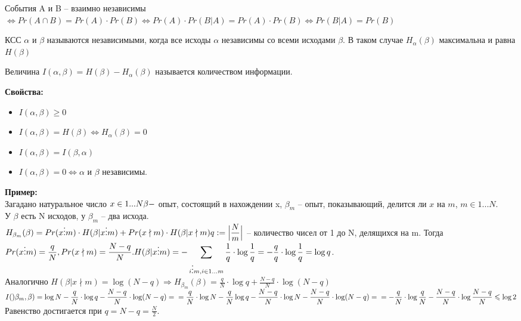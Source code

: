 	\begin{Def} 
		События A и B -- взаимно независимы $\Leftrightarrow Pr(A \cap B) = Pr(A) \cdot Pr(B) \Leftrightarrow Pr(A) \cdot Pr(B|A) = Pr(A) \cdot Pr(B) \Leftrightarrow Pr(B|A) = Pr(B)$
	\end{Def} 

	\begin{Def} 
	КСС $\alpha$ и $\beta$ называются независимыми, когда все исходы $\alpha$ независимы со всеми исходами $\beta$. В таком случае $H_{\alpha} (\beta)$ максимальна и равна $H(\beta)$
	\end{Def} 
	

	\begin{Def} 
		Величина $I(\alpha, \beta) = H(\beta) - H_{\alpha} (\beta)$ называется количеством информации.
	\end{Def} 

	\textbf{Свойства:}
	\begin{itemize}
		\item $I(\alpha, \beta) \geqslant 0$
		\item $I(\alpha, \beta) = H(\beta) \Leftrightarrow H_{\alpha} (\beta) = 0$
		\item $I(\alpha, \beta) = I(\beta, \alpha)$
		\item $I(\alpha, \beta) = 0 \Leftrightarrow \alpha \text{ и } \beta$ независимы.
	\end{itemize}
	
	\textbf{Пример:}\\
	Загадано натуральное число $x \in 1...N\\
	\beta -$ опыт, состоящий в нахождении x, $\beta_m$ -- опыт, показывающий, делится ли $x$ на $m$, $m \in 1...N$.\\ У $\beta$ есть N исходов, у $\beta_m$ -- два исхода.\\
	$\displaystyle H_{\beta_m}(\beta) = Pr (x \vdots m) \cdot H(\beta | x \vdots m) + Pr (x \nmid m) \cdot H (\beta | x \nmid m)\\
	q := \Big| \frac{N}{m} \Big|$ -- количество чисел от 1 до N, делящихся на m. Тогда $\displaystyle Pr(x \vdots m) = \frac{q}{N}, Pr(x \nmid m) = \frac{N-q}{N}.\\
	H(\beta|x \vdots m) = - \sum_{i \vdots m, i \in 1...m} \frac{1}{q} \cdot \log \frac{1}{q} = - \frac{q}{q} \cdot \log \frac{1}{q} = \log q$.\\
	Аналогично $\displaystyle H(\beta | x \nmid m) = \log (N-q) \Rightarrow H_{\beta_m}(\beta) = \frac{q}{N} \cdot \log q + \frac{N-q}{N} \cdot \log (N-q)$\\
	$\displaystyle I()\beta_m, \beta) = \log N - \frac{q}{N} \cdot \log q - \frac{N-q}{N} \cdot \log (N-q) = \\
	= \frac{q}{N} \cdot \log N - \frac{q}{N} \log q - \frac{N-q}{N} \cdot \log N - \frac{N-q}{N} \cdot \log (N-q) =\\
	= - \frac{q}{N} \cdot \log \frac{q}{N} - \frac{N-q}{N} \cdot \log \frac{N-q}{N} \leqslant \log 2$\\
	Равенство  достигается при $q = N - q = \frac{N}{2}$.\\ \\ 

